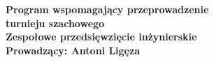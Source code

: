 \def\autor{Informatyka Stosowana III rok}
\def\tytul{\textbf{\LARGE Zespołowe Przedsięwzięcie Inżynierskie}}
\def\promotor{~}
\def\miejscerokwydania{Nowy Sącz \today}
\def\nazwauczelni{PAŃSTWOWA WYŻSZA SZKOŁA ZAWODOWA}
\def\imienia{INSTYTUT  TECHNICZNY}
\def\wydzial{Kierunek Informatyka Stosowana}

\thispagestyle{empty}
{
\hbox{}\textheight
\hspace{1cm}
\centering
\vbox{
\noindent\textbf{\Huge Program wspomagający przeprowadzenie \\ \vspace{0.3cm}turnieju szachowego}\vspace{0.5cm}\\
\noindent\textbf{\vspace{0.3cm}Zespołowe przedsięwzięcie inżynierskie}\\
\noindent\textbf{Prowadzący: Antoni Ligęza}}\\}
